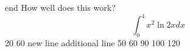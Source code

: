 \documentclass{article}
\begin{document}
end
How well does this work?
$$\int_0^4 x^2 \ln{2x}dx$$
20
60
new line
additional line
50
60
90
100
120
\end{document}
